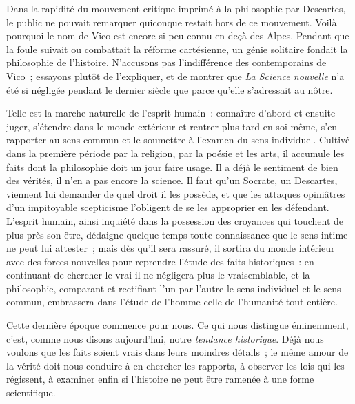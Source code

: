 \documentclass[french,twoside]{book} %
\begin{document}
\noindent  Dans la rapidité du mouvement critique imprimé à la philosophie par Descartes, le public ne pouvait remarquer quiconque restait hors de ce mouvement. Voilà pourquoi le nom de Vico est encore si peu connu en-deçà des Alpes. Pendant que la foule suivait ou combattait la réforme cartésienne, un génie solitaire fondait la philosophie de l’histoire. N’accusons pas l’indifférence des contemporains de Vico ; essayons plutôt de l’expliquer, et de montrer que {\itshape La Science nouvelle} n’a été si négligée pendant le dernier siècle que parce qu’elle s’adressait au nôtre.\par
Telle est la marche naturelle de l’esprit humain : connaître d’abord et ensuite juger, s’étendre dans le monde extérieur et rentrer plus tard en soi-même, s’en rapporter au sens commun et le soumettre à l’examen du sens individuel. Cultivé dans la première période par la religion, par la poésie et les  arts, il accumule les faits dont la philosophie doit un jour faire usage. Il a déjà le sentiment de bien des vérités, il n’en a pas encore la science. Il faut qu’un Socrate, un Descartes, viennent lui demander de quel droit il les possède, et que les attaques opiniâtres d’un impitoyable scepticisme l’obligent de se les approprier en les défendant. L’esprit humain, ainsi inquiété dans la possession des croyances qui touchent de plus près son être, dédaigne quelque temps toute connaissance que le sens intime ne peut lui attester ; mais dès qu’il sera rassuré, il sortira du monde intérieur avec des forces nouvelles pour reprendre l’étude des faits historiques : en continuant de chercher le vrai il ne négligera plus le vraisemblable, et la philosophie, comparant et rectifiant l’un par l’autre le sens individuel et le sens commun, embrassera dans l’étude de l’homme celle de l’humanité tout entière.\par
Cette dernière époque commence pour nous. Ce qui nous distingue éminemment, c’est, comme nous disons aujourd’hui, notre {\itshape tendance historique}. Déjà nous voulons que les faits soient vrais dans leurs moindres détails ; le même amour de la vérité doit nous conduire à en chercher les rapports, à observer les lois qui les régissent, à examiner enfin si l’histoire ne peut être ramenée à une forme scientifique.\par
\end{document}
